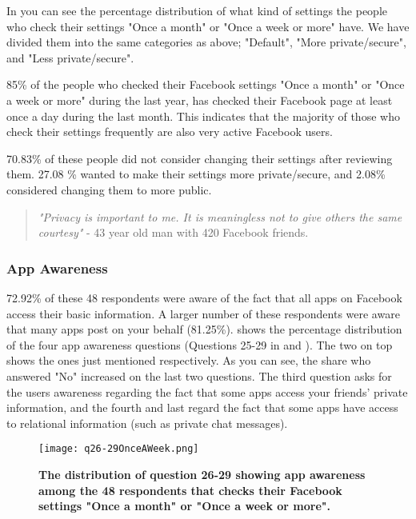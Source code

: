 In  you can see the percentage distribution of what kind of settings the people who check their settings "Once a month" or "Once a week or more" have. We have divided them into the same categories as above; "Default", "More private/secure", and "Less private/secure".  

85\% of the people who checked their Facebook settings "Once a month" or "Once a week or more" during the last year, has checked their Facebook page at least once a day during the last month. This indicates that the majority of those who check their settings frequently are also very active Facebook users. 

70.83\% of these people did not consider changing their settings after reviewing them. 27.08 \% wanted to make their settings more private/secure, and 2.08\% considered changing them to more public. 



\begin{quote}
\textit{"Privacy is important to me. It is meaningless not to give others the same courtesy"} - 43 year old man with 420 Facebook friends. 
\end{quote}


\subsubsection{App Awareness}
72.92\% of these 48 respondents were aware of the fact that all apps on Facebook access their basic information. A larger number of these respondents were aware that many apps post on your behalf (81.25\%).  shows the percentage distribution of the four app awareness questions (Questions 25-29 in  and ). The two on top shows the ones just mentioned respectively. As you can see, the share who answered "No" increased on the last two questions. The third question asks for the users awareness regarding the fact that some apps access your friends' private information, and the fourth and last regard the fact that some apps have access to relational information (such as private chat messages).  

\begin{figure}[h!]
\centering
\texttt{[image: q26-29OnceAWeek.png]}
\caption[The distribution of question 26-29 showing app awareness among the 48 respondents that checks their Facebook settings "Once a month" or "Once a week or more"]{\textbf{The distribution of question 26-29 showing app awareness among the 48 respondents that checks their Facebook settings "Once a month" or "Once a week or more".}} 
\label{fig:appawarenessonceaweek}
\end{figure}


